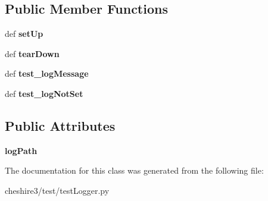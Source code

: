 \subsection*{Public Member Functions}
\begin{DoxyCompactItemize}
\item 
\hypertarget{classcheshire3_1_1test_1_1test_logger_1_1_simple_logger_default_level_test_case_ac9e6c3f9c147f41fba24b994083a3e6e}{def {\bfseries set\-Up}}\label{classcheshire3_1_1test_1_1test_logger_1_1_simple_logger_default_level_test_case_ac9e6c3f9c147f41fba24b994083a3e6e}

\item 
\hypertarget{classcheshire3_1_1test_1_1test_logger_1_1_simple_logger_default_level_test_case_a97bf45980c20cac4ab2d4a479628673d}{def {\bfseries tear\-Down}}\label{classcheshire3_1_1test_1_1test_logger_1_1_simple_logger_default_level_test_case_a97bf45980c20cac4ab2d4a479628673d}

\item 
\hypertarget{classcheshire3_1_1test_1_1test_logger_1_1_simple_logger_default_level_test_case_a66301035999211e1658096de14289c40}{def {\bfseries test\-\_\-log\-Message}}\label{classcheshire3_1_1test_1_1test_logger_1_1_simple_logger_default_level_test_case_a66301035999211e1658096de14289c40}

\item 
\hypertarget{classcheshire3_1_1test_1_1test_logger_1_1_simple_logger_default_level_test_case_a6b9c82c6b51d8d7ef0f482b674f84ed7}{def {\bfseries test\-\_\-log\-Not\-Set}}\label{classcheshire3_1_1test_1_1test_logger_1_1_simple_logger_default_level_test_case_a6b9c82c6b51d8d7ef0f482b674f84ed7}

\end{DoxyCompactItemize}
\subsection*{Public Attributes}
\begin{DoxyCompactItemize}
\item 
\hypertarget{classcheshire3_1_1test_1_1test_logger_1_1_simple_logger_default_level_test_case_a1ab3e9647d0920ba88be22e8e89f88e3}{{\bfseries log\-Path}}\label{classcheshire3_1_1test_1_1test_logger_1_1_simple_logger_default_level_test_case_a1ab3e9647d0920ba88be22e8e89f88e3}

\end{DoxyCompactItemize}


The documentation for this class was generated from the following file\-:\begin{DoxyCompactItemize}
\item 
cheshire3/test/test\-Logger.\-py\end{DoxyCompactItemize}

